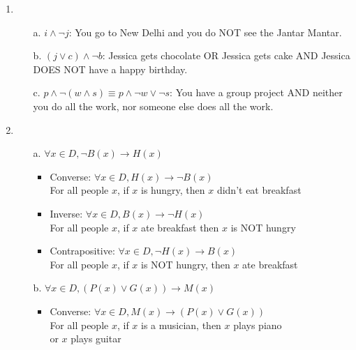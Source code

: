 \begin{enumerate}
    \item
        \begin{itemize}
            \item[a.]  $i \land \neg j$: You go to New Delhi and you do NOT see the Jantar Mantar.
            \item[b.]  $(j \lor c) \land \neg b$: Jessica gets chocolate OR Jessica gets cake AND
                        Jessica DOES NOT have a happy birthday.
            \item[c.]  $p \land \neg (w \land s) \equiv p \land \neg w \lor \neg s$: You have a group project AND
                        neither you do all the work, nor someone else does all the work.
        \end{itemize}
        
    \item
        \begin{itemize}
            \item[a.]  $\forall x \in D, \neg B(x) \to H(x)$
                    \begin{itemize}
                        \item Converse:
                                $\forall x \in D, H(x) \to \neg B(x)$      \\
                                For all people $x$, if $x$ is hungry, then $x$ didn't eat breakfast     
                        
                        \item Inverse:
                                $\forall x \in D, B(x) \to \neg H(x)$      \\
                                For all people $x$, if $x$ ate breakfast then $x$ is NOT hungry     
                        
                        \item Contrapositive:
                                $\forall x \in D, \neg H(x) \to B(x)$      \\
                                For all people $x$, if $x$ is NOT hungry, then $x$ ate breakfast     
                    \end{itemize}
            \item[b.] $\forall x \in D, (P(x) \lor G(x)) \to M(x)$
                    \begin{itemize}
                        \item Converse:
                                $\forall x \in D, M(x) \to (P(x) \lor G(x))$      \\
                                For all people $x$, if $x$ is a musician, then $x$ plays piano \\
                                or $x$ plays guitar     
                        

\end{itemize}
\end{itemize}
\end{enumerate}
